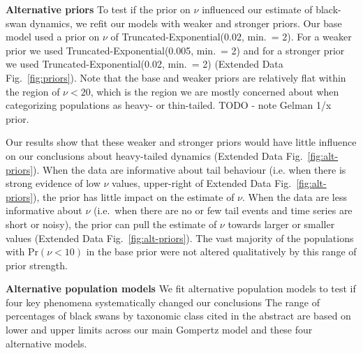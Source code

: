 \textbf{Alternative priors} To test if the prior on \(\nu\) influenced our estimate of black-swan dynamics, we refit our models with weaker and stronger priors. Our base model used a prior on \(\nu\) of Truncated-Exponential(0.02, min.\ = 2). For a weaker prior we used Truncated-Exponential(0.005, min.\ = 2) and for a stronger prior we used Truncated-Exponential(0.02, min.\ = 2) (Extended Data Fig.~\ref{fig:priors}). Note that the base and weaker priors are relatively flat within the region of \(\nu < 20\), which is the region we are mostly concerned about when categorizing populations as heavy- or thin-tailed. TODO - note Gelman 1/x prior.

Our results show that these weaker and stronger priors would have little influence on our conclusions about heavy-tailed dynamics (Extended Data Fig.~\ref{fig:alt-priors}). When the data are informative about tail behaviour (i.e. when there is strong evidence of low \(\nu\) values, upper-right of Extended Data Fig.~\ref{fig:alt-priors}), the prior has little impact on the estimate of \(\nu\). When the data are less informative about \(\nu\) (i.e.\ when there are no or few tail events and time series are short or noisy), the prior can pull the estimate of \(\nu\) towards larger or smaller values (Extended Data Fig.~\ref{fig:alt-priors}). The vast majority of the populations with Pr\((\nu < 10)\) in the base prior were not altered qualitatively by this range of prior strength.

\textbf{Alternative population models} We fit alternative population models to test if four key phenomena systematically changed our conclusions The range of percentages of black swans by taxonomic class cited in the abstract are based on lower and upper limits across our main Gompertz model and these four alternative models.

